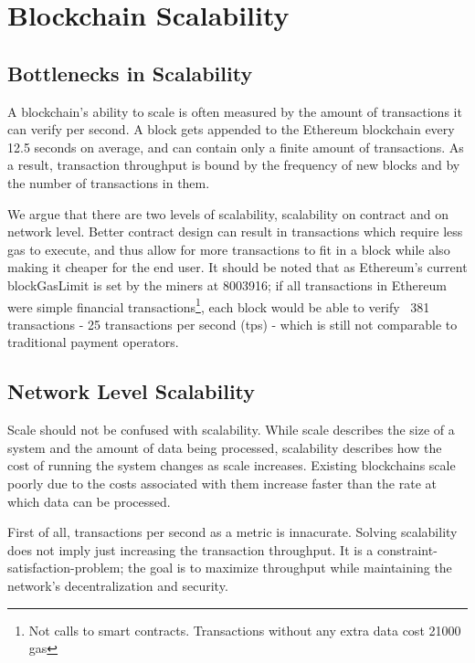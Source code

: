 \chapter{Blockchain Scalability}

\section{Bottlenecks in Scalability}
A blockchain's ability to scale is often measured by the amount of transactions it can verify per second. A block gets appended to the Ethereum blockchain every 12.5 seconds on average, and can contain only a finite amount of transactions. As a result, transaction throughput is bound by the frequency of new blocks and by the number of transactions in them.

We argue that there are two levels of scalability, scalability on contract and on network level. Better contract design can result in transactions which require less gas to execute, and thus allow for more transactions to fit in a block while also making it cheaper for the end user. It should be noted that as Ethereum's current blockGasLimit is set by the miners at 8003916; if all transactions in Ethereum were simple financial transactions\footnote{Not calls to smart contracts. Transactions without any extra data cost 21000 gas}, each block would be able to verify ~381 transactions - 25 transactions per second (tps) - which is still not comparable to traditional payment operators. 

\section{Network Level Scalability}
Scale should not be confused with scalability. While scale describes the size of a system and the amount of data being processed, scalability describes how the cost of running the system changes as scale increases. Existing blockchains scale poorly due to the costs associated with them increase faster than the rate at which data can be processed. 

First of all, transactions per second as a metric is innacurate. Solving scalability does not imply just increasing the transaction throughput. It is a constraint-satisfaction-problem; the goal is to maximize throughput while maintaining the network's decentralization and security. 

